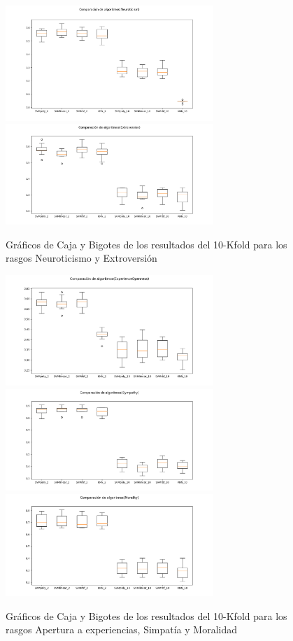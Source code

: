 \documentclass[10pt, a4paper]{article}
\begin{document}
        \begin{figure}[H]
            \centering
            \includegraphics[width = 0.7\textwidth]{boxplotNeuro.png}
            \includegraphics[width = 0.7\textwidth]{boxplotExtro.png}
            \caption{Gr\'aficos de Caja y Bigotes de los resultados del 10-Kfold para los rasgos Neuroticismo y Extroversi\'on}
        \end{figure}
        \begin{figure}[H]
            \centering
            \includegraphics[width = 0.7\textwidth]{boxplotExp.png}
            \includegraphics[width = 0.7\textwidth]{boxplotSymp.png}
            \includegraphics[width = 0.7\textwidth]{boxplotMor.png}
            \caption{Gr\'aficos de Caja y Bigotes de los resultados del 10-Kfold para los rasgos Apertura a experiencias, Simpat\'ia  y Moralidad}
        \end{figure}
   
\end{document}
